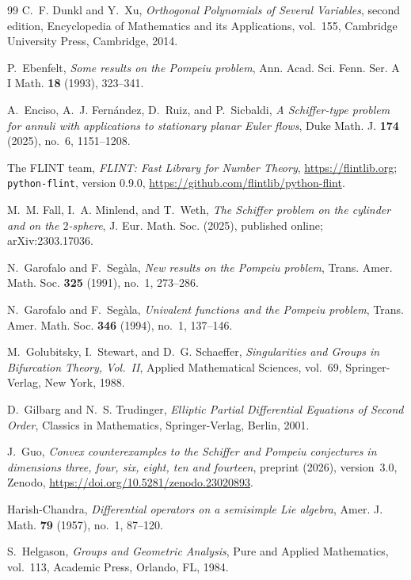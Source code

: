 \documentclass[11pt]{amsart}
\theoremstyle{definition}
\theoremstyle{remark}
\numberwithin{equation}{section}
\begin{document}
\begin{thebibliography}{99}
C.~F. Dunkl and Y.~Xu, \emph{Orthogonal Polynomials of Several Variables}, second edition, Encyclopedia of Mathematics and its Applications, vol.~155, Cambridge University Press, Cambridge, 2014.

P.~Ebenfelt, \emph{Some results on the Pompeiu problem}, Ann. Acad. Sci. Fenn. Ser. A I Math. \textbf{18} (1993), 323--341.

A.~Enciso, A.~J. Fern\'andez, D.~Ruiz, and P.~Sicbaldi, \emph{A Schiffer-type problem for annuli with applications to stationary planar Euler flows}, Duke Math. J. \textbf{174} (2025), no.~6, 1151--1208.

The FLINT team, \emph{FLINT: Fast Library for Number Theory}, \url{https://flintlib.org}; \texttt{python-flint}, version 0.9.0, \url{https://github.com/flintlib/python-flint}.

M.~M. Fall, I.~A. Minlend, and T.~Weth, \emph{The Schiffer problem on the cylinder and on the $2$-sphere}, J. Eur. Math. Soc. (2025), published online; arXiv:2303.17036.

N.~Garofalo and F.~Seg\`ala, \emph{New results on the Pompeiu problem}, Trans. Amer. Math. Soc. \textbf{325} (1991), no.~1, 273--286.

N.~Garofalo and F.~Seg\`ala, \emph{Univalent functions and the Pompeiu problem}, Trans. Amer. Math. Soc. \textbf{346} (1994), no.~1, 137--146.

M.~Golubitsky, I.~Stewart, and D.~G. Schaeffer, \emph{Singularities and Groups in Bifurcation Theory, Vol.~II}, Applied Mathematical Sciences, vol.~69, Springer-Verlag, New York, 1988.

D.~Gilbarg and N.~S. Trudinger, \emph{Elliptic Partial Differential Equations of Second Order}, Classics in Mathematics, Springer-Verlag, Berlin, 2001.

J.~Guo, \emph{Convex counterexamples to the Schiffer and Pompeiu conjectures in dimensions three, four, six, eight, ten and fourteen}, preprint (2026), version~3.0, Zenodo, \url{https://doi.org/10.5281/zenodo.23020893}.

Harish-Chandra, \emph{Differential operators on a semisimple Lie algebra}, Amer. J. Math. \textbf{79} (1957), no.~1, 87--120.

S.~Helgason, \emph{Groups and Geometric Analysis}, Pure and Applied Mathematics, vol.~113, Academic Press, Orlando, FL, 1984.


\end{thebibliography}
\end{document}

